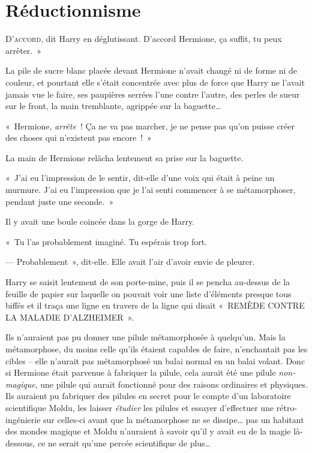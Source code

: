 \chapter{Réductionnisme}

\lettrine[ante=«~]{D}{'accord}, dit Harry en déglutissant.
D'accord Hermione, ça suffit, tu peux arrêter.~»

La pile de sucre blanc placée devant Hermione n'avait changé ni de forme ni de couleur, et pourtant elle s'était concentrée avec plus de force que Harry ne l'avait jamais vue le faire, ses paupières serrées l'une contre l'autre, des perles de sueur sur le front, la main tremblante, agrippée sur la baguette…

«~Hermione, \emph{arrête}~!
Ça ne va pas marcher, je ne pense pas qu'on puisse créer des choses qui n'existent pas encore~!~»

La main de Hermione relâcha lentement sa prise sur la baguette.

«~J'ai eu l'impression de le sentir, dit-elle d'une voix qui était à peine un murmure.
J'ai eu l'impression que je l'ai senti commencer à se métamorphoser, pendant juste une seconde.~»

Il y avait une boule coincée dans la gorge de Harry.

«~Tu l'as probablement imaginé.
Tu espérais trop fort.

--- Probablement~», dit-elle.
Elle avait l'air d'avoir envie de pleurer.

Harry se saisit lentement de son porte-mine, puis il se pencha au-dessus de la feuille de papier sur laquelle on pouvait voir une liste d'éléments presque tous biffés et il traça une ligne en travers de la ligne qui disait «~REMÈDE CONTRE LA MALADIE D'ALZHEIMER~».

Ils n'auraient pas pu donner une pilule métamorphosée à quelqu'un.
Mais la métamorphose, du moins celle qu'ils étaient capables de faire, n'enchantait pas les cibles -- elle n'aurait pas métamorphosé un balai normal en un balai volant.
Donc si Hermione était parvenue à fabriquer la pilule, cela aurait été une pilule \emph{non-magique}, une pilule qui aurait fonctionné pour des raisons ordinaires et physiques.
Ils auraient pu fabriquer des pilules en secret pour le compte d'un laboratoire scientifique Moldu, les laisser \emph{étudier} les pilules et essayer d'effectuer une rétro-ingénierie sur celles-ci avant que la métamorphose ne se dissipe… pas un habitant des mondes magique et Moldu n'auraient à savoir qu'il y avait eu de la magie là-dessous, ce ne serait qu'une percée scientifique de plus…

